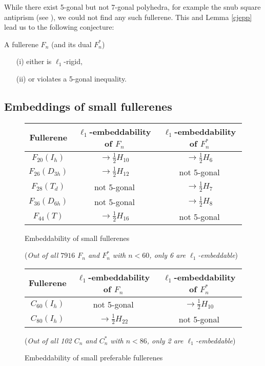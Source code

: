 While there exist 5-gonal but not 7-gonal polyhedra, for example the snub 
square antiprism (see \cite{b71,Za}), we could not find any such fullerene. 
This and Lemma \ref{cjepp} lead us to the following conjecture:

\begin{conjecture}\label{violat}
 A fullerene $F_n$ (and its dual $F^*_n$)
\begin{itemize}
\item[(i)] either is $\ell_1$-rigid,
\item[(ii)] or violates a 5-gonal inequality.
\end{itemize}
\end{conjecture}

\subsection{Embeddings of small fullerenes}\label{sec2}
\begin{figure}[htb]
\begin{center}
\begin{tabular}{|c|c|c|} \hline
Fullerene & $\ell_1$-embeddability of $F_n$ & $\ell_1$-embeddability of $F^*_n$ \\ \hline \hline
$F_{20}(I_h)$ & $\rightarrow\frac{1}{2}H_{10}$ & $\rightarrow\frac{1}{2}H_{6}$\\ \hline
$F_{26}(D_{3h})$ & $\rightarrow\frac{1}{2}H_{12}$ & not 5-gonal \\ \hline
$F_{28}(T_d)$ & not 5-gonal & $\rightarrow\frac{1}{2}H_{7}$ \\ \hline
$F_{36}(D_{6h})$ & not 5-gonal & $\rightarrow\frac{1}{2}H_{8}$ \\ \hline
$F_{44}(T)$ & $\rightarrow\frac{1}{2}H_{16}$ & not 5-gonal \\ \hline
\end{tabular}
 
\caption{Embeddability of small fullerenes}\label{status1}
({\em Out of all $7916$ $F_n$ and $F^*_n$ with $n< 60$, 
only 6 are $\ell_1$-embeddable})
\end{center}

\begin{center}
\begin{tabular}{|c|c|c|} \hline
Fullerene & $\ell_1$-embeddability of $F_n$ & $\ell_1$-embeddability of $F^*_n$ \\ \hline \hline
$C_{60}(I_h)$ & not 5-gonal & $\rightarrow\frac{1}{2}H_{10}$ \\ \hline
$C_{80}(I_h)$ & $\rightarrow\frac{1}{2}H_{22}$ & not 5-gonal \\ \hline
\end{tabular}

\caption{Embeddability of small preferable fullerenes}\label{status2}
({\em Out of all 102 $C_n$ and $C^*_n$ with $n< 86$, 
only 2  %
are $\ell_1$-embeddable})
\end{center}
\end{figure}

